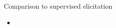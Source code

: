 \begin{frame}{Comparison to supervised elicitation}
  \begin{itemize}
    \item {}
  \end{itemize}
\end{frame}
